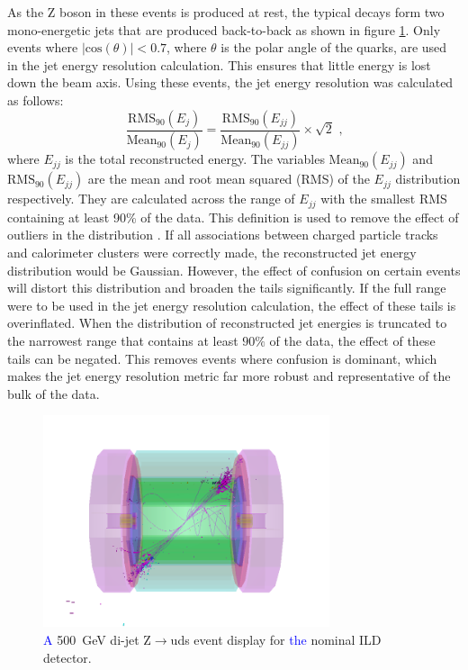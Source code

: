 As the Z boson in these events is produced at rest, the typical decays form two mono-energetic jets that are produced back-to-back as shown in figure \ref{fig:500GeVzudsevtdisplay}.  Only events where $|\text{cos}(\theta)| < 0.7$, where $\theta$ is the polar angle of the quarks, are used in the jet energy resolution calculation.  This ensures that little energy is lost down the beam axis.  Using these events, the jet energy resolution was calculated as follows: 
\begin{equation} 
\frac{\text{RMS}_{90}(E_{j})}{\text{Mean}_{90}(E_{j})} = \frac{\text{RMS}_{90}(E_{jj})}{\text{Mean}_{90}(E_{jj})} \times \sqrt{2} \text{ ,}
\end{equation}
\noindent where $E_{jj}$ is the total reconstructed energy.  The variables $\text{Mean}_{90}(E_{jj})$ and $\text{RMS}_{90}(E_{jj})$ are the mean and root mean squared (RMS) of the $E_{jj}$ distribution respectively.  They are calculated across the range of $E_{jj}$ with the smallest RMS containing at least 90\% of the data.  This definition is used to remove the effect of outliers in the distribution \cite{arXiv:0907.3577}.  If all associations between charged particle tracks and calorimeter clusters were correctly made, the reconstructed jet energy distribution would be Gaussian.  However, the effect of confusion on certain events will distort this distribution and broaden the tails significantly.  If the full range were to be used in the jet energy resolution calculation, the effect of these tails is overinflated.  When the distribution of reconstructed jet energies is truncated to the narrowest range that contains at least $90\%$ of the data, the effect of these tails can be negated.  This removes events where confusion is dominant, which makes the jet energy resolution metric far more robust and representative of the bulk of the data.  

\begin{figure}[h!]
\centering
\includegraphics[width=0.75\textwidth]{OptimisationStudies/Plots/MethodDescription/500GeVEvent.png}
\caption[\textcolor{blue}{A} 500~GeV di-jet Z$\rightarrow$uds event display for \textcolor{blue}{the} nominal ILD detector.]{\textcolor{blue}{A} 500~GeV di-jet Z$\rightarrow$uds event display for \textcolor{blue}{the} nominal ILD detector.}
\label{fig:500GeVzudsevtdisplay}
\end{figure} 

